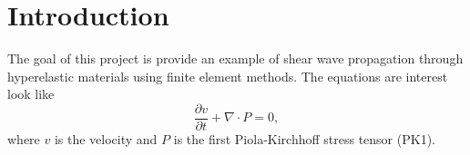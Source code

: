 \section{Introduction}
The goal of this project is provide an example of shear wave propagation through hyperelastic materials using finite element methods. The equations are interest look like
\begin{equation}
  \frac{\partial v}{\partial t} + \nabla\cdot P = 0,
\end{equation}
where $v$ is the velocity and $P$ is the first Piola-Kirchhoff stress tensor (PK1).
